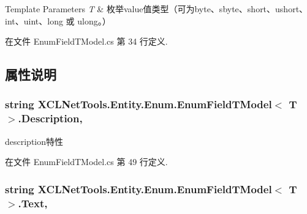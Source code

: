 \begin{DoxyTemplParams}{Template Parameters}
{\em T} & 枚举value值类型（可为byte、sbyte、short、ushort、int、uint、long 或 ulong。）\\
\hline
\end{DoxyTemplParams}


在文件 Enum\-Field\-T\-Model.\-cs 第 34 行定义.



\subsection{属性说明}
\hypertarget{class_x_c_l_net_tools_1_1_entity_1_1_enum_1_1_enum_field_t_model_3_01_t_01_4_a6702736fc7d4f0f7cfefb74722f9c2ba}{
\subsubsection[{Description}]{\setlength{\rightskip}{0pt plus 5cm}string X\-C\-L\-Net\-Tools.\-Entity.\-Enum.\-Enum\-Field\-T\-Model$<$ T $>$.Description\hspace{0.3cm}{\ttfamily [get]}, {\ttfamily [set]}}}\label{class_x_c_l_net_tools_1_1_entity_1_1_enum_1_1_enum_field_t_model_3_01_t_01_4_a6702736fc7d4f0f7cfefb74722f9c2ba}


description特性 



在文件 Enum\-Field\-T\-Model.\-cs 第 49 行定义.

\hypertarget{class_x_c_l_net_tools_1_1_entity_1_1_enum_1_1_enum_field_t_model_3_01_t_01_4_a19570f5fcd9bb314ca1e7e8f3b8f44b1}{
\subsubsection[{Text}]{\setlength{\rightskip}{0pt plus 5cm}string X\-C\-L\-Net\-Tools.\-Entity.\-Enum.\-Enum\-Field\-T\-Model$<$ T $>$.Text\hspace{0.3cm}{\ttfamily [get]}, {\ttfamily [set]}}}\label{class_x_c_l_net_tools_1_1_entity_1_1_enum_1_1_enum_field_t_model_3_01_t_01_4_a19570f5fcd9bb314ca1e7e8f3b8f44b1}


